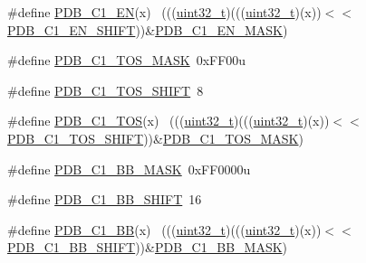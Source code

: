\begin{DoxyCompactItemize}
\#define \hyperlink{group___p_d_b___register___masks_ga7e9b62307eff24ef79343968a29906c5}{P\+D\+B\+\_\+\+C1\+\_\+\+EN}(x)                                                      ~(((\hyperlink{_p_e___types_8h_a33594304e786b158f3fb30289278f5af}{uint32\+\_\+t})(((\hyperlink{_p_e___types_8h_a33594304e786b158f3fb30289278f5af}{uint32\+\_\+t})(x))$<$$<$\hyperlink{group___p_d_b___register___masks_ga99bd07d734f0e46a718933179b61402b}{P\+D\+B\+\_\+\+C1\+\_\+\+E\+N\+\_\+\+S\+H\+I\+FT}))\&\hyperlink{group___p_d_b___register___masks_ga318b4eb1bb609120bed14b19c91ef0c1}{P\+D\+B\+\_\+\+C1\+\_\+\+E\+N\+\_\+\+M\+A\+SK})
\item 
\#define \hyperlink{group___p_d_b___register___masks_gabc4c3ddddcd8ab8629495457629a560e}{P\+D\+B\+\_\+\+C1\+\_\+\+T\+O\+S\+\_\+\+M\+A\+SK}~0x\+F\+F00u
\item 
\#define \hyperlink{group___p_d_b___register___masks_ga5f76b81da95cec6cc1dcbd761e48d32f}{P\+D\+B\+\_\+\+C1\+\_\+\+T\+O\+S\+\_\+\+S\+H\+I\+FT}~8
\item 
\#define \hyperlink{group___p_d_b___register___masks_ga22e6c87baf70c29554cc6b03a5acbf08}{P\+D\+B\+\_\+\+C1\+\_\+\+T\+OS}(x)                                                    ~(((\hyperlink{_p_e___types_8h_a33594304e786b158f3fb30289278f5af}{uint32\+\_\+t})(((\hyperlink{_p_e___types_8h_a33594304e786b158f3fb30289278f5af}{uint32\+\_\+t})(x))$<$$<$\hyperlink{group___p_d_b___register___masks_ga5f76b81da95cec6cc1dcbd761e48d32f}{P\+D\+B\+\_\+\+C1\+\_\+\+T\+O\+S\+\_\+\+S\+H\+I\+FT}))\&\hyperlink{group___p_d_b___register___masks_gabc4c3ddddcd8ab8629495457629a560e}{P\+D\+B\+\_\+\+C1\+\_\+\+T\+O\+S\+\_\+\+M\+A\+SK})
\item 
\#define \hyperlink{group___p_d_b___register___masks_ga4e6f86caa6df500cedef06d1638194ca}{P\+D\+B\+\_\+\+C1\+\_\+\+B\+B\+\_\+\+M\+A\+SK}~0x\+F\+F0000u
\item 
\#define \hyperlink{group___p_d_b___register___masks_gadd4b49047fcd1a75374752c012a931d8}{P\+D\+B\+\_\+\+C1\+\_\+\+B\+B\+\_\+\+S\+H\+I\+FT}~16
\item 
\#define \hyperlink{group___p_d_b___register___masks_ga9b59c900467acc6be0d8963aa5c88e91}{P\+D\+B\+\_\+\+C1\+\_\+\+BB}(x)                                                      ~(((\hyperlink{_p_e___types_8h_a33594304e786b158f3fb30289278f5af}{uint32\+\_\+t})(((\hyperlink{_p_e___types_8h_a33594304e786b158f3fb30289278f5af}{uint32\+\_\+t})(x))$<$$<$\hyperlink{group___p_d_b___register___masks_gadd4b49047fcd1a75374752c012a931d8}{P\+D\+B\+\_\+\+C1\+\_\+\+B\+B\+\_\+\+S\+H\+I\+FT}))\&\hyperlink{group___p_d_b___register___masks_ga4e6f86caa6df500cedef06d1638194ca}{P\+D\+B\+\_\+\+C1\+\_\+\+B\+B\+\_\+\+M\+A\+SK})
$$
\end{DoxyCompactItemize}
